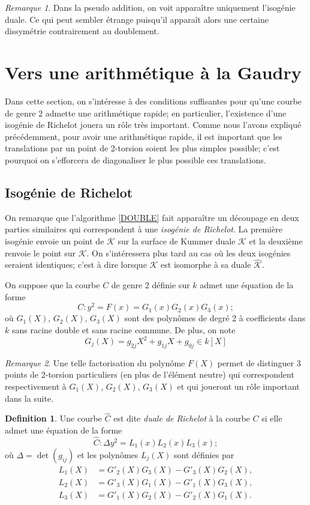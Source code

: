 \documentclass[a4paper,12pt]{article}
\theoremstyle{definition}
\newtheorem{definition}{Definition}[section]
\theoremstyle{remark}
\newtheorem{remarque}{Remarque}
\numberwithin{equation}{section}
\begin{document}
\begin{remarque}
Dans la pseudo addition, on voit apparaître uniquement l'isogénie duale. Ce qui peut sembler étrange puisqu'il apparaît alors une certaine dissymétrie contrairement au doublement.
\end{remarque}

\section{Vers une arithmétique à la Gaudry}

Dans cette section, on s'intéresse à des conditions suffisantes pour qu'une courbe de genre 2 admette une arithmétique rapide; en particulier, l'existence d'une isogénie de Richelot jouera un rôle très important. Comme nous l'avons expliqué précédemment, pour avoir une arithmétique rapide, il est important que les translations par un point de 2-torsion soient les plus simples possible; c'est pourquoi on s'efforcera de diagonaliser le plus possible ces translations.

\subsection{Isogénie de Richelot}
\label{IsoRich}
On remarque que l'algorithme \ref{DOUBLE} fait apparaître un découpage en deux parties similaires qui correspondent à une \emph{isogénie de Richelot}. La première isogénie envoie un point de $\mathcal{K}$ sur la surface de Kummer duale $\hat{\mathcal{K}}$ et la deuxième renvoie le point sur $\mathcal{K}$. On s'intéressera plus tard au cas où les deux isogénies seraient identiques; c'est à dire lorsque $\mathcal{K}$ est isomorphe à sa duale $\hat{\mathcal{K}}$.

On suppose que la courbe $C$ de genre 2 définie sur $k$ admet une équation de la forme
$$C : y^2 = F(x) = G_1(x)G_2(x)G_3(x);$$
où $G_1(X)$, $G_2(X)$, $G_3(X)$ sont des polynômes de degré 2 à coefficients dans $k$ sans racine double et sans racine commune. De plus, on note
$$G_j(X) = g_{2j}X^2 + g_{1j}X + g_{0j} \in k[X]$$

\begin{remarque}
Une telle factorisation du polynôme $F(X)$ permet de distinguer 3 points de 2-torsion particuliers (en plus de l'élément neutre) qui correspondent respectivement à $G_1(X)$, $G_2(X)$, $G_3(X)$ et qui joueront un rôle important dans la suite.
\end{remarque}

\begin{definition}
Une courbe $\hat{C}$ est dite \emph{duale de Richelot} à la courbe $C$ si elle admet une équation de la forme
$$\hat{C} : \Delta y^2 = L_1(x)L_2(x)L_3(x);$$
où $\Delta = \det(g_{ij})$ et les polynômes $L_j(X)$ sont définies par
\begin{align*}
L_1(X) &= G'_2(X)G_3(X) - G'_3(X)G_2(X), \\
L_2(X) &= G'_3(X)G_1(X) - G'_1(X)G_3(X), \\
L_3(X) &= G'_1(X)G_2(X) - G'_2(X)G_1(X).
\end{align*}
\end{definition}
\end{document}
